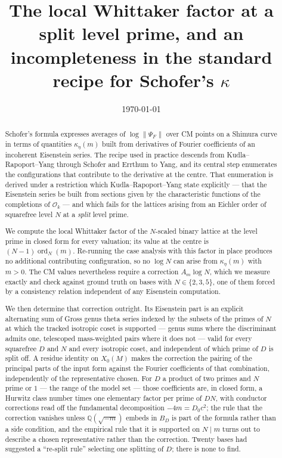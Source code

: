 \documentclass[11pt,reqno]{amsart}
\theoremstyle{plain}
\theoremstyle{definition}
\DeclareMathOperator{\ord}{ord}
\newcommand{\Q}{\mathbb{Q}}
\begin{document}
\title[The local Whittaker factor at a split level prime]
{The local Whittaker factor at a split level prime, and an incompleteness
in the standard recipe for Schofer's $\kappa$}

\author{}
\date{\today}

\begin{abstract}
Schofer's formula expresses averages of $\log\lVert\Psi_F\rVert$ over CM points on a Shimura
curve in terms of quantities $\kappa_\eta(m)$ built from derivatives of Fourier coefficients of an
incoherent Eisenstein series. The recipe used in practice descends from Kudla--Rapoport--Yang
through Schofer and Errthum to Yang, and its central step enumerates the configurations that
contribute to the derivative at the centre. That enumeration is derived under a restriction which
Kudla--Rapoport--Yang state explicitly --- that the Eisenstein series be built from sections given
by the characteristic functions of the completions of $\mathcal{O}_k$ --- and which fails for the
lattices arising from an Eichler order of squarefree level $N$ at a \emph{split} level prime.

We compute the local Whittaker factor of the $N$-scaled binary lattice at the level prime in closed
form for every valuation; its value at the centre is $(N-1)\ord_N(m)$. Re-running the case analysis
with this factor in place produces no additional contributing configuration, so no $\log N$ can
arise from $\kappa_\eta(m)$ with $m>0$. The CM values nevertheless require a correction
$A_m\log N$, which we measure exactly and check against ground truth on bases with
$N\in\{2,3,5\}$, one of them forced by a consistency relation independent of any Eisenstein
computation.

We then determine that correction outright. Its Eisenstein part is an explicit alternating sum of
Gross genus theta series indexed by the subsets of the primes of $N$ at which the tracked isotropic
coset is supported --- genus sums where the discriminant admits one, telescoped mass-weighted pairs
where it does not --- valid for every squarefree $D$ and $N$ and every isotropic coset, and
independent of which prime of $D$ is split off. A residue identity on $X_0(M)$ makes the correction
the pairing of the principal parts of the input form against the Fourier coefficients of that
combination, independently of the representative chosen. For $D$ a product of two primes and $N$ prime or $1$
--- the range of the model set --- those coefficients are, in closed form, a Hurwitz class number
times one elementary factor per prime of $DN$, with conductor corrections read off the fundamental
decomposition $-4m=D_0c^2$; the rule that the correction vanishes unless $\Q(\sqrt{-m})$ embeds in
$B_D$ is part of the formula rather than a side condition, and the empirical rule that it is
supported on $N\mid m$ turns out to describe a chosen representative rather than the correction.
Twenty bases had suggested a ``re-split rule'' selecting one splitting of $D$; there is none to
find.


\end{abstract}
\end{document}
